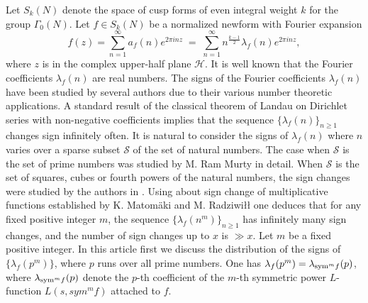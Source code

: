 \documentclass[12pt,a4paper,reqno]{amsart}
\begin{document}
Let $S_k(N)$ denote the space of cusp forms of even integral weight $k$ for the group 
$\Gamma_0(N)$. 
Let $f\in S_k(N)$ be a normalized newform with Fourier expansion  
\begin{equation}\label{fourier}
f(z)=\sum_{n=1}^{\infty}a_f(n)e^{2\pi i nz}\; =\; \sum_{n=1}^{\infty}n^{\frac{k-1}{2}}\lambda_f(n)e^{2\pi inz},
\end{equation}
where $z$ is in the complex upper-half plane $\mathcal{H}$.
It is well known that the Fourier coefficients $\lambda_f(n)$ are real numbers. 
The signs of the Fourier coefficients $\lambda_f(n)$ have been studied by several authors due to their various number theoretic applications. A standard result of the classical theorem of Landau on Dirichlet series with non-negative coefficients implies that the sequence $\{\lambda_f(n)\}_{n\geq 1}$ changes sign infinitely often. 
It is natural to consider the signs of $\lambda_f(n)$ where $n$ varies over a sparse subset $\mathcal{S}$ of the set of natural numbers. The case when $\mathcal{S}$ is the set of prime numbers was studied by M. Ram Murty \cite{Ram} in detail. When $\mathcal{S}$ is the set of squares, cubes or fourth powers of the natural numbers, the sign changes were studied by the authors in \cite{JKV}. 
Using \cite[Corollary 3]{MR} about sign change of multiplicative functions established by 
K. Matom{\"a}ki and M. Radziwi{\l}{\l} one deduces that for any fixed positive integer $m$, the sequence 
$\{\lambda_f(n^m)\}_{n\geq 1}$ has infinitely many sign changes, and the number of sign changes up to $x$ is $\gg x$. 
Let $m$ be a fixed positive integer. In this article first we discuss the distribution of the signs of 
$\{\lambda_f(p^m)\}$, where $p$ runs over all prime numbers. One has 
$\lambda_f(p^m)=\lambda_{{\rm sym}^m f}(p)$, where $\lambda_{{\rm sym}^m f}(p)$ denote the 
$p$-th coefficient of the  $m$-th symmetric power $L$-function $L(s, sym^m f)$ attached to $f$. 
\end{document}
